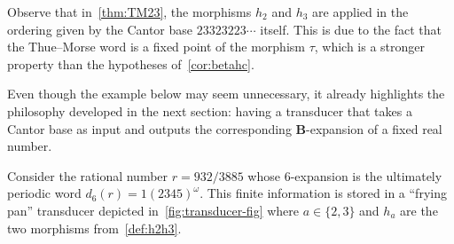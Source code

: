 \documentclass[12pt,reqno]{amsart}
\newcommand{\B}{{\mathbf{B}}}
\begin{document}
 Observe that in~\cref{thm:TM23}, the morphisms $h_2$ and $h_3$ are applied in the ordering given by the Cantor base $23323223\cdots$ itself. This is due to the fact that the Thue--Morse word is a fixed point of the morphism $\tau$, which is a stronger property than the hypotheses of~\cref{cor:betahc}.

Even though the example below may seem unnecessary, it already highlights the philosophy developed in the next section: having a transducer that takes a Cantor base as input and outputs the corresponding $\B$-expansion of a fixed real number.

\begin{example}
\label{exa:first_transducer}
Consider the rational number $r=932/3885$ whose $6$-expansion is the ultimately periodic word $d_6(r)=1(2345)^\omega$. This finite information is stored in a ``frying pan'' transducer depicted in~\cref{fig:transducer-fig} where $a\in\{2,3\}$ and $h_a$ are the two morphisms from~\cref{def:h2h3}. 
\begin{figure}[ht]
   \begin{center}
\end{center}
\end{figure}
\end{example}
\end{document}
